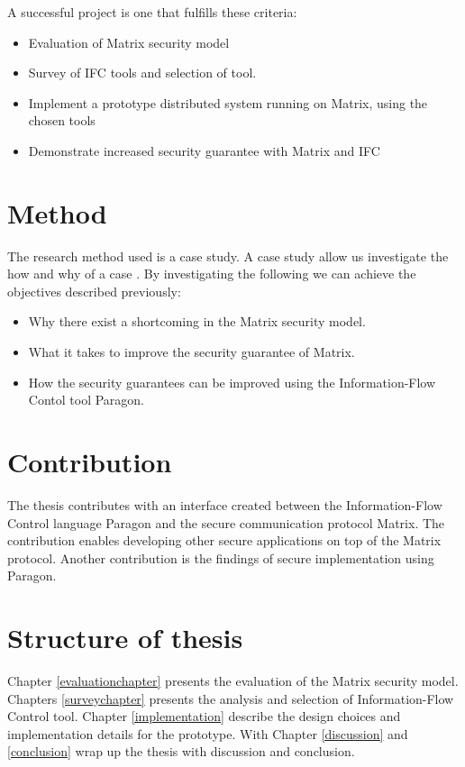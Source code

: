 A successful project is one that fulfills these criteria: 

\begin{itemize}
	\item Evaluation of Matrix security model
	\item Survey of IFC tools and selection of tool.
	\item Implement a prototype distributed system running on Matrix, using the chosen tools
	\item Demonstrate increased security guarantee with Matrix and IFC
\end{itemize}   

\section{Method}
The research method used is a case study. A case study allow us investigate 
the how and why of a case \cite{yin}. By investigating the following we can achieve the objectives described previously:

\begin{itemize}
	\item Why there exist a shortcoming in the Matrix security model.
	\item What it takes to improve the security guarantee of Matrix. 
	\item How the security guarantees can be improved using the Information-Flow Contol tool Paragon.
\end{itemize}


\section{Contribution} %

The thesis contributes with an interface created between the Information-Flow Control language Paragon and the secure communication protocol Matrix. The contribution enables developing other secure applications on top of the Matrix protocol. Another contribution is the findings of secure implementation using Paragon.

 
 
\section{Structure of thesis} %

Chapter \ref{evaluationchapter} presents the evaluation of the Matrix security model. Chapters \ref{surveychapter} presents the analysis and selection of Information-Flow Control tool. Chapter \ref{implementation} describe the design choices and implementation details for the prototype. With Chapter \ref{discussion} and \ref{conclusion} wrap up the thesis with discussion and conclusion. 
 
